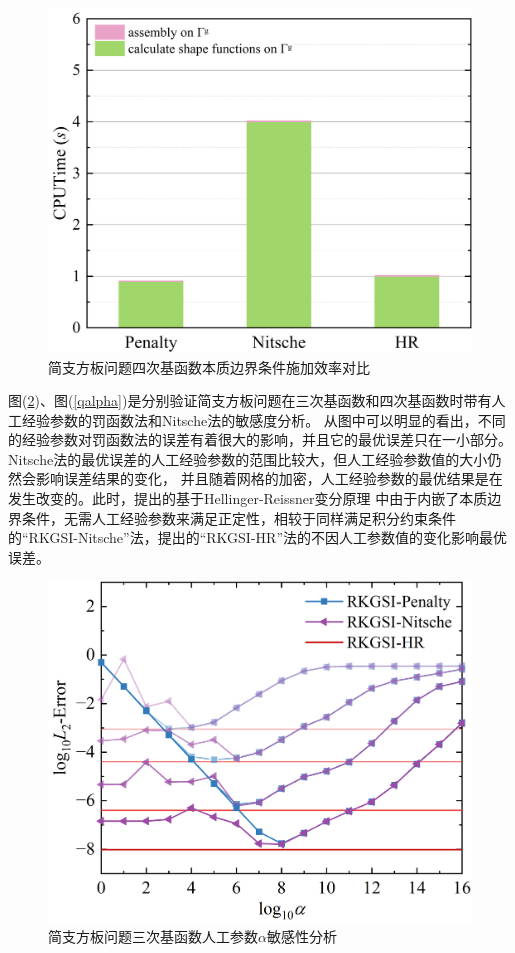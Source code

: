 \begin{figure}[H]
    \centering
    \includegraphics[scale=0.5]{figure/PHR/R/Qefficiency.png}
    \caption{简支方板问题四次基函数本质边界条件施加效率对比}\label{RQcputime}
\end{figure}
图(\ref{calpha})、图(\ref{qalpha})是分别验证简支方板问题在三次基函数和四次基函数时带有人工经验参数的罚函数法和Nitsche法的敏感度分析。
从图中可以明显的看出，不同的经验参数对罚函数法的误差有着很大的影响，并且它的最优误差只在一小部分。
Nitsche法的最优误差的人工经验参数的范围比较大，但人工经验参数值的大小仍然会影响误差结果的变化，
并且随着网格的加密，人工经验参数的最优结果是在发生改变的。此时，提出的基于Hellinger-Reissner变分原理
中由于内嵌了本质边界条件，无需人工经验参数来满足正定性，相较于同样满足积分约束条件的“RKGSI-Nitsche”法，提出的“RKGSI-HR”法的不因人工参数值的变化影响最优误差。
\newpage
\begin{figure}[H]
    \centering
    \includegraphics[scale=0.5]{figure/PHR/R/calpha.png}
    \caption{简支方板问题三次基函数人工参数$\alpha$敏感性分析}\label{calpha}
\end{figure}
